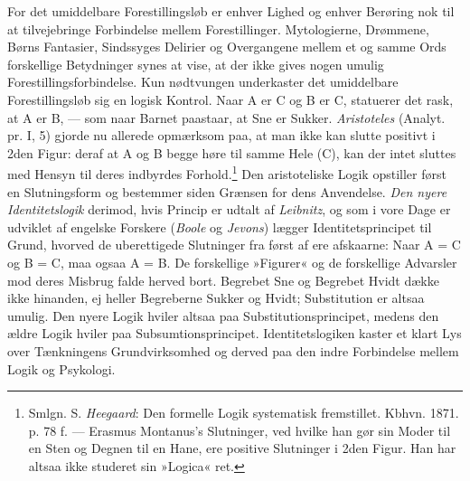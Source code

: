 \documentclass[12pt,a4paper,openany]{book}
\newcommand{\opage}[1]{\marginnote{\footnotesize\textit{[#1]}}}
\begin{document}
For det umiddelbare Forestillingsløb er enhver Lighed og enhver Berøring
nok til at tilvejebringe Forbindelse mellem Forestillinger.
Mytologierne, Drømmene, Børns Fantasier, Sindssyges Delirier og
Overgangene mellem et og samme Ords forskellige Betydninger synes at
vise, at der ikke gives nogen umulig Forestillingsforbindelse. Kun
nødtvungen underkaster det umiddelbare Forestillingsløb sig en logisk
Kontrol. Naar A er C og B er C, statuerer det rask, at A er B, --- som
naar Barnet paastaar, at Sne er Sukker. \emph{Aristoteles} (Analyt. pr.
I, 5) gjorde nu allerede opmærksom paa, at man ikke kan slutte positivt
i 2den Figur: deraf at A og B begge høre til samme Hele (C), kan der
intet sluttes med Hensyn til deres indbyrdes Forhold.\footnote[1]{Smlgn.
S. \emph{Heegaard}: Den formelle Logik systematisk fremstillet. Kbhvn.
1871. p. 78 f. --- Erasmus Montanus’s Slutninger, ved hvilke han gør sin
Moder til en Sten og Degnen til en Hane, ere positive Slutninger i 2den
Figur. Han har altsaa ikke studeret sin »Logica« ret.} Den aristoteliske
Logik opstiller først en Slutningsform og bestemmer siden Grænsen for
dens Anvendelse. \emph{Den nyere Identitetslogik} derimod, hvis Princip
er udtalt af \emph{Leibnitz}, og som i vore Dage er udviklet af engelske
Forskere (\emph{Boole} og \emph{Jevons}) lægger Identitetsprincipet til
Grund, hvorved de uberettigede Slutninger fra først af ere afskaarne:
Naar A = C og B = C, maa ogsaa A = B. De forskellige »Figurer« og de
forskellige Advarsler mod deres Misbrug falde herved bort. Begrebet Sne
og Begrebet Hvidt dække ikke hinanden, ej heller Begreberne Sukker og
Hvidt; Substitution er altsaa umulig. Den nyere Logik hviler altsaa paa
Substitutionsprincipet, medens den ældre Logik hviler paa
Subsumtionsprincipet. Identitetslogiken
\opage{218}kaster et klart Lys over Tænkningens Grundvirksomhed og
derved paa den indre Forbindelse mellem Logik og Psykologi.
\end{document}
